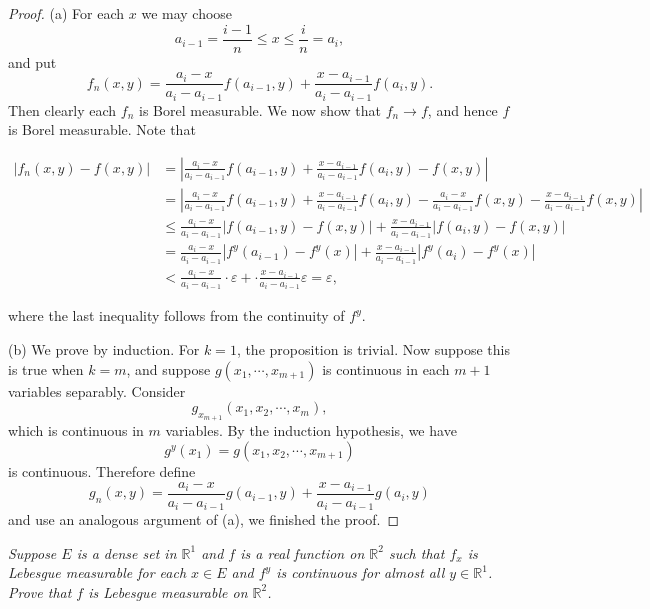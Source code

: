 \begin{proof}
(a) For each $x$ we may choose 
$$
a_{i-1}=\frac{i-1}{n}\le x\le \frac{i}{n}=a_i,
$$
and put 
$$
f_n\left( x,y \right) =\frac{a_i-x}{a_i-a_{i-1}}f\left( a_{i-1},y \right) +\frac{x-a_{i-1}}{a_i-a_{i-1}}f\left( a_i,y \right) .
$$
Then clearly each $f_n$ is Borel measurable. We now show that $f_n\to f$, and hence $f$ is Borel measurable. Note that 
\begin{small}
$$
\begin{aligned}
\left| f_n\left( x,y \right) -f\left( x,y \right) \right|&=\left| \frac{a_i-x}{a_i-a_{i-1}}f\left( a_{i-1},y \right) +\frac{x-a_{i-1}}{a_i-a_{i-1}}f\left( a_i,y \right) -f\left( x,y \right) \right|
\\
&=\left| \frac{a_i-x}{a_i-a_{i-1}}f\left( a_{i-1},y \right) +\frac{x-a_{i-1}}{a_i-a_{i-1}}f\left( a_i,y \right) -\frac{a_i-x}{a_i-a_{i-1}}f\left( x,y \right) -\frac{x-a_{i-1}}{a_i-a_{i-1}}f\left( x,y \right) \right|
\\
&\le \frac{a_i-x}{a_i-a_{i-1}}\left| f\left( a_{i-1},y \right) -f\left( x,y \right) \right|+\frac{x-a_{i-1}}{a_i-a_{i-1}}\left| f\left( a_i,y \right) -f\left( x,y \right) \right|
\\
&=\frac{a_i-x}{a_i-a_{i-1}}\left| f^y\left( a_{i-1} \right) -f^y\left( x \right) \right|+\frac{x-a_{i-1}}{a_i-a_{i-1}}\left| f^y\left( a_i \right) -f^y\left( x \right) \right|
\\
&<\frac{a_i-x}{a_i-a_{i-1}}\cdot \varepsilon +\cdot \frac{x-a_{i-1}}{a_i-a_{i-1}}\varepsilon =\varepsilon ,
\end{aligned}
$$
\end{small}
where the last inequality follows from the continuity of $f^y$.\par
(b) We prove by induction. For $k=1$, the proposition is trivial. Now suppose this is true when $k=m$, and suppose $g(x_1,\cdots,x_{m+1})$ is continuous in each $m+1$ variables separably. Consider 
$$
g_{x_{m+1}}\left( x_1,x_2,\cdots ,x_m \right) ,
$$
which is continuous in $m$ variables. By the induction hypothesis, we have 
$$
g^y\left( x_1 \right) =g\left( x_1,x_2,\cdots ,x_{m+1} \right) 
$$
is continuous. Therefore define 
$$
g_n\left( x,y \right) =\frac{a_i-x}{a_i-a_{i-1}}g\left( a_{i-1},y \right) +\frac{x-a_{i-1}}{a_i-a_{i-1}}g\left( a_i,y \right) 
$$
and use an analogous argument of (a), we finished the proof.
\end{proof}
\begin{problem}\em
Suppose $E$ is a dense set in $\mathbb{R}^1$ and $f$ is a real function on $\mathbb{R}^2$ such that $f_x$ is Lebesgue measurable for each $x\in E$ and $f^y$ is continuous for almost all $y\in\mathbb{R}^1$. Prove that $f$ is Lebesgue measurable on $\mathbb{R}^2$.
\end{problem}
